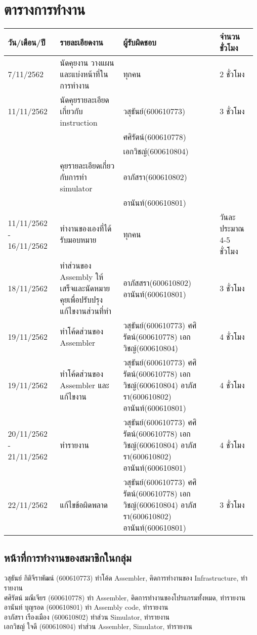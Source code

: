 \documentclass[14pt]{article}
\begin{document}
\newpage
\section{ตารางการทำงาน}
\begin{tabular}{ |p{2cm}|p{6cm}|p{3cm}|p{2cm}|  }
\hline
วัน/เดือน/ปี & รายละเอียดงาน &ผู้รับผิดชอบ & จำนวนชั่วโมง\\
\hline
7/11/2562 & นัดคุยงาน วางแผน และแบ่งหน้าที่ในการทำงาน  & ทุกคน & 2 ชั่วโมง\\
\hline
11/11/2562 & นัดคุยรายละเอียดเกี่ยวกับ instruction  & วสุธันย์(600610773) &3 ชั่วโมง\\ &&ศศิรัตน์(600610778) &\\ &&เอกวิชญ์(600610804) & \\
          & คุยรายละเอียดเกี่ยวกับการทำ simulator & อาภัสรา(600610802)  &\\ && อานันท์(600610801) & \\
\hline
11/11/2562 - 16/11/2562 &ทำงานของเองที่ได้รับมอบหมาย & ทุกคน & วันละประมาณ 4-5 ชั่วโมง\\
\hline
18/11/2562 &ทำส่วนของ Assembly ให้เสร็จและนัดหมายคุยเพื่อปรับปรุงแก้ไขงานส่วนที่ทำ & อาภัสสรา(600610802)        อานันท์(600610801) & 3 ชั่วโมง\\
\hline
19/11/2562 &ทำโค้ดส่วนของ Assembler & วสุธันย์(600610773)    ศศิรัตน์(600610778) เอกวิชญ์(600610804) & 4 ชั่วโมง\\
\hline
19/11/2562 &ทำโค้ดส่วนของ Assembler และแก้ไขงาน  & วสุธันย์(600610773)    ศศิรัตน์(600610778) เอกวิชญ์(600610804)  อาภัสรา(600610802) อานันท์(600610801) & 4 ชั่วโมง\\
\hline
20/11/2562 - 21/11/2562 &ทำรายงาน & วสุธันย์(600610773)    ศศิรัตน์(600610778) เอกวิชญ์(600610804)  อาภัสรา(600610802) อานันท์(600610801) & 4 ชั่วโมง\\
\hline
22/11/2562 &แก้ไขข้อผิดพลาด& วสุธันย์(600610773)    ศศิรัตน์(600610778) เอกวิชญ์(600610804)  อาภัสรา(600610802) อานันท์(600610801) & 3 ชั่วโมง\\
\hline
\end{tabular}
\subsection{หน้าที่การทำงานของสมาชิกในกลุ่ม}
วสุธันย์ กิติจีราพัฒน์ (600610773) ทำโค้ด Assembler, คิดการทำงานของ Infrastructure, ทำรายงาน\\
ศศิรัตน์ มณีเจียร (600610778) ทำ Assembler, คิดการทำงานของโปรแกรมทั้งหมด, ทำรายงาน\\
อานันท์ บุญรอด (600610801) ทำ Assembly code, ทำรายงาน\\
อาภัสรา เรืองเมือง (600610802) ทำส่วน Simulator, ทำรายงาน\\
เอกวิชญ์ ใจดี (600610804) ทำส่วน Assembler, Simulator, ทำรายงาน\\
\end{document}

